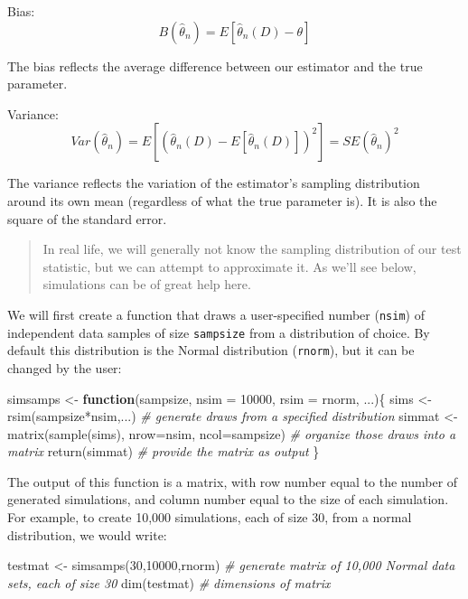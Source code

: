 \documentclass[
]{book}
\newenvironment{Shaded}{\begin{snugshade}}{\end{snugshade}}
\newcommand{\AttributeTok}[1]{\textcolor[rgb]{0.77,0.63,0.00}{#1}}
\newcommand{\CommentTok}[1]{\textcolor[rgb]{0.56,0.35,0.01}{\textit{#1}}}
\newcommand{\ControlFlowTok}[1]{\textcolor[rgb]{0.13,0.29,0.53}{\textbf{#1}}}
\newcommand{\DecValTok}[1]{\textcolor[rgb]{0.00,0.00,0.81}{#1}}
\newcommand{\FunctionTok}[1]{\textcolor[rgb]{0.00,0.00,0.00}{#1}}
\newcommand{\NormalTok}[1]{#1}
\newcommand{\OtherTok}[1]{\textcolor[rgb]{0.56,0.35,0.01}{#1}}
\newcommand{\SpecialCharTok}[1]{\textcolor[rgb]{0.00,0.00,0.00}{#1}}
\begin{document}
Bias: \[B(\hat\theta_n) =  E[\hat\theta_n(D) - \theta] \]

The bias reflects the average difference between our estimator and the true parameter.

Variance: \[Var(\hat\theta_n) =  E[ (\hat\theta_n(D) - E[\hat\theta_n(D)] )^2] = SE(\hat\theta_n)^2\]

The variance reflects the variation of the estimator's sampling distribution around its own mean (regardless of what the true parameter is). It is also the square of the standard error.

\begin{quote}
In real life, we will generally not know the sampling distribution of our test statistic, but we can attempt to approximate it. As we'll see below, simulations can be of great help here.
\end{quote}

We will first create a function that draws a user-specified number (\texttt{nsim}) of independent data samples of size \texttt{sampsize} from a distribution of choice. By default this distribution is the Normal distribution (\texttt{rnorm}), but it can be changed by the user:

\begin{Shaded}
\begin{Highlighting}[]
\NormalTok{simsamps }\OtherTok{\textless{}{-}} \ControlFlowTok{function}\NormalTok{(sampsize, }\AttributeTok{nsim =} \DecValTok{10000}\NormalTok{, }\AttributeTok{rsim =}\NormalTok{ rnorm, ...)\{}
\NormalTok{  sims }\OtherTok{\textless{}{-}} \FunctionTok{rsim}\NormalTok{(sampsize}\SpecialCharTok{*}\NormalTok{nsim,...) }\CommentTok{\# generate draws from a specified distribution}
\NormalTok{  simmat }\OtherTok{\textless{}{-}} \FunctionTok{matrix}\NormalTok{(}\FunctionTok{sample}\NormalTok{(sims), }\AttributeTok{nrow=}\NormalTok{nsim, }\AttributeTok{ncol=}\NormalTok{sampsize) }\CommentTok{\# organize those draws into a matrix}
  \FunctionTok{return}\NormalTok{(simmat) }\CommentTok{\# provide the matrix as output}
\NormalTok{\}}
\end{Highlighting}
\end{Shaded}

The output of this function is a matrix, with row number equal to the number of generated simulations, and column number equal to the size of each simulation. For example, to create 10,000 simulations, each of size 30, from a normal distribution, we would write:

\begin{Shaded}
\begin{Highlighting}[]
\NormalTok{testmat }\OtherTok{\textless{}{-}} \FunctionTok{simsamps}\NormalTok{(}\DecValTok{30}\NormalTok{,}\DecValTok{10000}\NormalTok{,rnorm) }\CommentTok{\# generate matrix of 10,000 Normal data sets, each of size 30}
\FunctionTok{dim}\NormalTok{(testmat) }\CommentTok{\# dimensions of matrix}
\end{Highlighting}
\end{Shaded}
\end{document}
